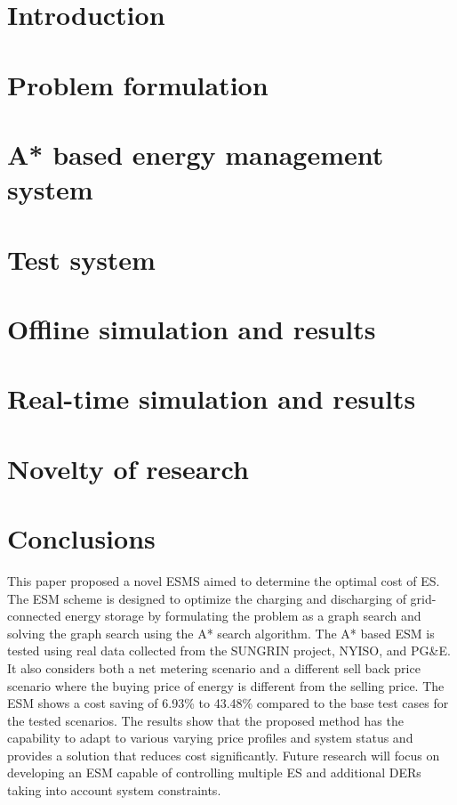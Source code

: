 \documentclass[journal]{IEEEtran}
\begin{document}
\section{Introduction}


\section{Problem formulation} \label{formulation}


\section{A* based energy management system} \label{A*}


\section{Test system} \label{sys}


\section{Offline simulation and results} \label{OFF}


\section{Real-time simulation and results} \label{RT}


\section{Novelty of research} \label{Novelty}


\section{Conclusions}
This paper proposed a novel ESMS aimed to determine the optimal cost of ES. The ESM scheme is designed to optimize the charging and discharging of grid-connected energy storage by formulating the problem as a graph search and solving the graph search using the A* search algorithm. The A* based ESM is tested using real data collected from the SUNGRIN project, NYISO, and PG\&E. It also considers both a net metering scenario and a different sell back price scenario where the buying price of energy is different from the selling price. The ESM shows a cost saving of 6.93\% to 43.48\% compared to the base test cases for the tested scenarios. The results show that the proposed method has the capability to adapt to various varying price profiles and system status and provides a solution that reduces cost significantly. Future research will focus on developing an ESM capable of controlling multiple ES and additional DERs taking into account system constraints.




\ifCLASSOPTIONcaptionsoff
  \newpage
\fi
\end{document}
